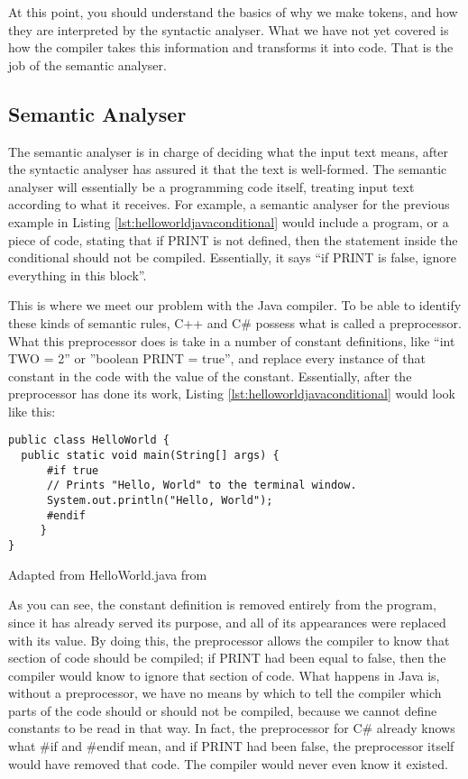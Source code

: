 At this point, you should understand the basics of why we make tokens, and how they are interpreted by the syntactic analyser. What we have not yet covered is how the compiler takes this information and transforms it into code. That is the job of the semantic analyser.


\subsection{Semantic Analyser}

The semantic analyser is in charge of deciding what the input text means, after the syntactic analyser has assured it that the text is well-formed. The semantic analyser will essentially be a programming code itself, treating input text according to what it receives. For example, a semantic analyser for the previous example in Listing \ref{lst:helloworldjavaconditional} would include a program, or a piece of code, stating that if PRINT is not defined, then the statement inside the conditional should not be compiled. Essentially, it says ``if PRINT is false, ignore everything in this block''.

This is where we meet our problem with the Java compiler. To be able to identify these kinds of semantic rules, C++ and C\# possess what is called a preprocessor. What this preprocessor does is take in a number of constant definitions, like ``int TWO = 2'' or ''boolean PRINT = true'', and replace every instance of that constant in the code with the value of the constant. Essentially, after the preprocessor has done its work, Listing \ref{lst:helloworldjavaconditional} would look like this:

\begin{listing}
\begin{verbatim}
public class HelloWorld {
  public static void main(String[] args) {
      #if true
      // Prints "Hello, World" to the terminal window.
      System.out.println("Hello, World");
      #endif
     }
}
\end{verbatim}
\caption{Adapted from HelloWorld.java from \cite{SEDGEWICK:2011}} \label{lst:helloworldjavaconditional2}
\end{listing}

As you can see, the constant definition is removed entirely from the program, since it has already served its purpose, and all of its appearances were replaced with its value. By doing this, the preprocessor allows the compiler to know that section of code should be compiled; if PRINT had been equal to false, then the compiler would know to ignore that section of code. What happens in Java is, without a preprocessor, we have no means by which to tell the compiler which parts of the code should or should not be compiled, because we cannot define constants to be read in that way. In fact, the preprocessor for C\# already knows what \#if and \#endif mean, and if PRINT had been false, the preprocessor itself would have removed that code. The compiler would never even know it existed.

